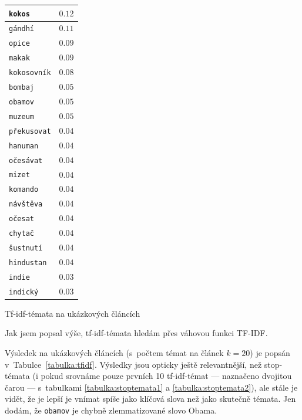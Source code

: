 \documentclass[12pt,a4paper]{report}
\begin{document}
{\begin{tabular}{ |l | r | }
        
        \texttt{kokos} & $0.12$ \\ \hline
        \texttt{gándhí} & $0.11$ \\ \hline
        \texttt{opice} & $0.09$ \\ \hline
        \texttt{makak} & $0.09$ \\ \hline
        \texttt{kokosovník} & $0.08$ \\ \hline
        \texttt{bombaj} & $0.05$ \\ \hline
        \texttt{obamov} & $0.05$ \\ \hline
        \texttt{muzeum} & $0.05$ \\ \hline
        \texttt{překusovat} & $0.04$ \\ \hline
        \texttt{hanuman} & $0.04$ \\ \hline
        \hline
        \texttt{očesávat} & $0.04$ \\ \hline
        \texttt{mizet} & $0.04$ \\ \hline
        \texttt{komando} & $0.04$ \\ \hline
        \texttt{návštěva} & $0.04$ \\ \hline
        \texttt{očesat} & $0.04$ \\ \hline
        \texttt{chytač} & $0.04$ \\ \hline
        \texttt{šustnutí} & $0.04$ \\ \hline
        \texttt{hindustan} & $0.04$ \\ \hline
        \texttt{indie} & $0.03$ \\ \hline
        \texttt{indický} & $0.03$ \\ \hline
        
        
      \end{tabular}


} {Tf-idf-témata na ukázkových článcích}


Jak jsem popsal výše, tf-idf-témata hledám přes váhovou funkci TF-IDF. 

Výsledek na ukázkových článcích (s~počtem témat na článek $k=20$) je popsán v~Tabulce~\ref{tabulka:tfidf}. Výsledky jsou opticky ještě relevantnější, než stop-témata (i pokud srovnáme pouze prvních 10 tf-idf-témat --- naznačeno dvojitou čarou --- s~tabulkami \ref{tabulka:stoptemata1} a \ref{tabulka:stoptemata2}), ale stále je vidět, že je lepší je vnímat spíše jako klíčová slova než jako skutečně témata. Jen dodám, že \texttt{obamov} je chybně zlemmatizované slovo Obama.
\end{document}
